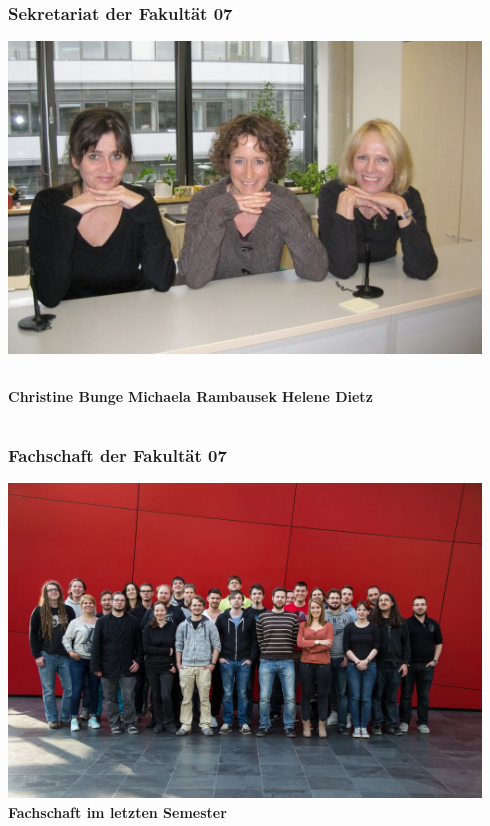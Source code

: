 \documentclass{beamer}
\begin{document}
    \begin{frame} 
    	\frametitle{Sekretariat der Fakultät 07}
    	\includegraphics[width=0.94\textwidth]{sekretariat.jpg}
    	\begin{columns}[t]
    		\textbf{Christine Bunge}
    		\textbf{Michaela Rambausek}
    		\textbf{Helene Dietz}
    	\end{columns}
    \end{frame}
    
    \begin{frame} 
        \frametitle{Fachschaft der Fakultät 07}
        \includegraphics[width=0.94\textwidth]{fachschaft.jpg}
        \\
        \textbf{Fachschaft im letzten Semester}
    \end{frame}
    
\end{document}
